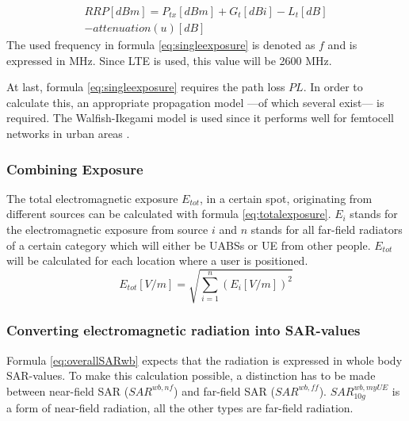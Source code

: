\documentclass[twocolumn]{phdsymp} %
\begin{document}
\begin{equation}
\begin{aligned}
RRP [dBm] = P_{tx} [dBm] + G_t [dBi]- L_t [dB]\\
     - attenuation(u) [dB]
\end{aligned}
\label{eq:eirp}
\end{equation}
The used frequency in formula \ref{eq:singleexposure} is denoted as $f$ and is expressed in MHz. Since \gls{LTE} is used, this value will be 2600 MHz.

At last, formula \ref{eq:singleexposure} requires the path loss $PL$. In order to calculate this, an appropriate propagation model ---of which several exist--- is required.
The Walfish-Ikegami model is used since it performs well for femtocell networks in urban areas \cite{J2}. %

\subsubsection{Combining Exposure}
The total electromagnetic exposure $E_{tot}$, in a certain spot, originating from different sources can be calculated with formula \ref{eq:totalexposure}. $E_i$ stands for 
the electromagnetic exposure from source $i$ and
$n$ stands for all far-field radiators of a certain category which will either be UABSs or UE from other people.
$E_{tot}$ will be calculated for each location where a user is positioned.  
\begin{equation}
E_{tot} [V/m] = \sqrt{\sum_{i=1}^{n} (E_i [V/m]) ^2}
\label{eq:totalexposure}
\end{equation}

\subsubsection{Converting electromagnetic radiation into SAR-values}
Formula \ref{eq:overallSARwb} expects that the radiation is expressed in whole body \gls{SAR}-values.
To make this calculation possible, a distinction has to be made between near-field \gls{SAR}
($SAR^{wb,nf}$) and far-field \gls{SAR} ($SAR^{wb,ff}$). $SAR^{wb,myUE}_{10g}$ is a form of near-field radiation, 
all the other types are far-field radiation.
\end{document}
